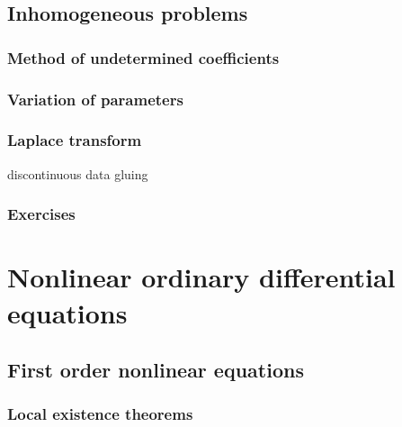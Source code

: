 \documentclass{../../large}
\begin{document}
\chapter{Inhomogeneous problems}
\section{Method of undetermined coefficients}
\section{Variation of parameters}
\section{Laplace transform}

discontinuous data gluing


\section*{Exercises}

\begin{prb}
\end{prb}






\part{Nonlinear ordinary differential equations}
\chapter{First order nonlinear equations}
\section{Local existence theorems}
\end{document}
